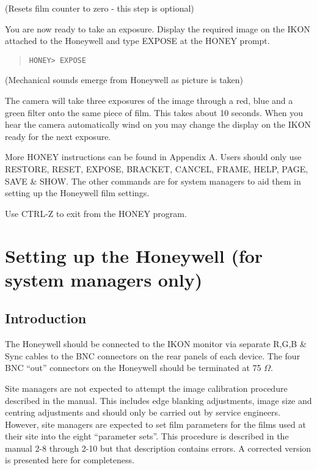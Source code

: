(Resets film counter to zero - this step is optional)

You are now ready to take an exposure. Display the required image on the
IKON attached to the Honeywell and type EXPOSE at the HONEY prompt.   

\begin{quote}
\begin{verbatim}
HONEY> EXPOSE
\end{verbatim}
\end{quote}

(Mechanical sounds emerge from Honeywell as picture is taken)

The
camera will take three exposures of the image through a red, blue and a green
filter onto the same piece of film. This takes about 10 seconds. When you hear
the camera automatically wind on you may change the display on the IKON
ready for the next exposure. 

More HONEY instructions can be found in Appendix A. Users should only use
RESTORE, RESET, EXPOSE, BRACKET, CANCEL, FRAME, HELP, PAGE, SAVE \& 
SHOW. The other
commands are for system managers to aid them in setting up the Honeywell
film settings.

Use CTRL-Z to exit from the HONEY program.

\section{Setting up the Honeywell (for system managers only)}

\subsection{Introduction} 

The Honeywell should be connected to the IKON monitor via separate R,G,B \&
Sync cables to the BNC connectors on the rear panels of each device. The four
BNC ``out'' connectors on the Honeywell should be terminated at 75 $\Omega$.

Site managers are not expected to attempt the image calibration procedure
described in the manual. This  includes edge blanking adjustments, image size
and centring adjustments and should only be carried out by service engineers.
However, site managers are expected to set film parameters for the films used
at their site into the eight ``parameter sets''. This procedure is
described in the manual 2-8 through 2-10 but that
description contains errors. A corrected version is presented here for
completeness.

